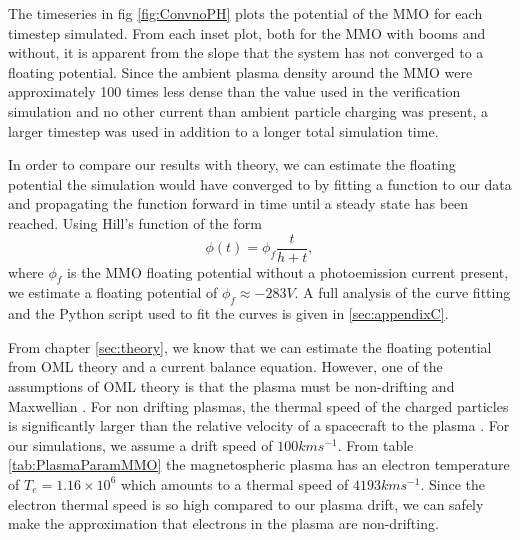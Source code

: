 The timeseries in fig \ref{fig:ConvnoPH} plots the potential of the MMO for each timestep simulated. From each inset plot, both for the MMO with booms and without, it is apparent from the slope that the system has not converged to a floating potential. Since the ambient plasma density around the MMO were approximately 100 times less dense than the value used in the verification simulation and no other current than ambient particle charging was present, a larger timestep was used in addition to a longer total simulation time. 

In order to compare our results with theory, we can estimate the floating potential the simulation would have converged to by fitting a function to our data and propagating the function forward in time until a steady state has been reached. Using Hill's function of the form 
\begin{equation*}
    \phi(t) = \phi_f \frac{t}{h + t},
\end{equation*}
where $\phi_f$ is the MMO floating potential without a photoemission current present, we estimate a floating potential of $\phi_f \approx - 283 V$. A full analysis of the curve fitting and the Python script used to fit the curves is given in  \cref{sec:appendixC}.

From chapter \cref{sec:theory}, we know that we can estimate the floating potential from OML theory and a current balance equation. However, one of the assumptions of OML theory is that the plasma must be non-drifting and Maxwellian \parencite{Shipple1981}. For non drifting plasmas, the thermal speed of the charged particles is significantly larger than the relative velocity of a spacecraft to the plasma \parencite{Jacobsen2010}. For our simulations, we assume a drift speed of $100 km s^{-1}$. From table \ref{tab:PlasmaParamMMO} the magnetospheric plasma has an electron temperature of $T_e = 1.16 \times 10^6$ which amounts to a thermal speed of $4193 km s^{-1}$. Since the electron thermal speed is so high compared to our plasma drift, we can safely make the approximation that electrons in the plasma are non-drifting. 

